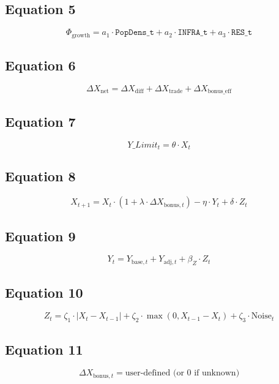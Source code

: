 \documentclass[12pt]{article}
\begin{document}
\subsection*{Equation 5}
\begin{equation}
\Phi_{\text{growth}} = a_1 \cdot \texttt{PopDens\_t} + a_2 \cdot \texttt{INFRA\_t} + a_3 \cdot \texttt{RES\_t}
\end{equation}

\subsection*{Equation 6}
\begin{equation}
\Delta X_{\text{net}} = \Delta X_{\text{diff}} + \Delta X_{\text{trade}} + \Delta X_{\text{bonus\_eff}}
\end{equation}

\subsection*{Equation 7}
\begin{equation}
Y\_Limit_t = \theta \cdot X_t
\end{equation}

\subsection*{Equation 8}
\begin{equation}
X_{t+1} = X_t \cdot \left(1 + \lambda \cdot \Delta X_{\text{bonus},t} \right) - \eta \cdot Y_t + \delta \cdot Z_t
\end{equation}

\subsection*{Equation 9}
\begin{equation}
Y_t = Y_{\text{base},t} + Y_{\text{adj},t} + \beta_Z \cdot Z_t
\end{equation}

\subsection*{Equation 10}
\begin{equation}
Z_t = \zeta_1 \cdot |X_t - X_{t-1}| + \zeta_2 \cdot \max(0, X_{t-1} - X_t) + \zeta_3 \cdot \text{Noise}_t
\end{equation}

\subsection*{Equation 11}
\begin{equation}
\Delta X_{\text{bonus},t} = \text{user-defined (or } 0 \text{ if unknown)}
\end{equation}
\end{document}
